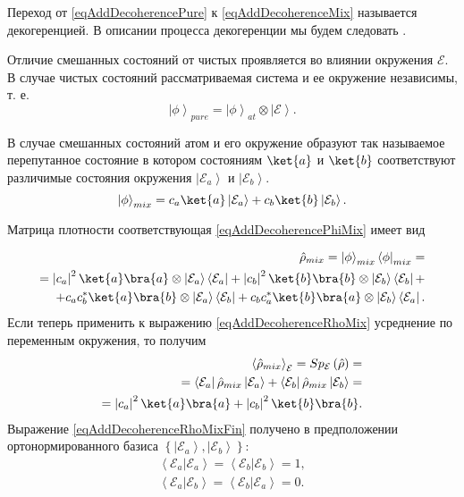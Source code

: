 Переход от \eqref{eqAddDecoherencePure} к \eqref{eqAddDecoherenceMix}
называется декогеренцией.
В описании процесса декогеренции мы будем следовать
 \cite{bMensky2001}. 

Отличие смешанных состояний от чистых проявляется во влиянии окружения
$\mathcal{E}$. В случае чистых состояний рассматриваемая система и ее
окружение независимы, т. е.
\begin{equation}
\left|\phi\right>_{pure} = \left|\phi\right>_{at} \otimes
\left|\mathcal{E}\right>.
\label{eqAddDecoherencePhiPure}
\end{equation}

В случае смешанных состояний атом и его окружение образуют так
называемое перепутанное состояние в котором состояниям
$\ket{a}$ и $\ket{b}$ соответствуют различимые 
состояния окружения $\left|\mathcal{E}_a\right>$ и
$\left|\mathcal{E}_b\right>$.
\begin{equation}
\left|\phi\right>_{mix} = c_a\ket{a} \left|\mathcal{E}_a\right>
+ c_b\ket{b} \left|\mathcal{E}_b\right>.
\label{eqAddDecoherencePhiMix}
\end{equation}

Матрица плотности 
соответствующая \eqref{eqAddDecoherencePhiMix} имеет вид

\begin{eqnarray}
\hat{\rho}_{mix} = \left|\phi\right>_{mix}\left<\phi\right|_{mix} = 
\nonumber \\
= 
\left|c_a\right|^2 \ket{a}\bra{a} \otimes
\left|\mathcal{E}_a\right>\left<\mathcal{E}_a\right| + 
\left|c_b\right|^2 \ket{b}\bra{b} \otimes
\left|\mathcal{E}_b\right>\left<\mathcal{E}_b\right| +
\nonumber \\
+
c_a c_b^{\ast}\ket{a}\bra{b} \otimes
\left|\mathcal{E}_a\right>\left<\mathcal{E}_b\right| +
c_b c_a^{\ast}\ket{b}\bra{a} \otimes
\left|\mathcal{E}_b\right>\left<\mathcal{E}_a\right|.
\label{eqAddDecoherenceRhoMix}
\end{eqnarray}
Если теперь применить к выражению \eqref{eqAddDecoherenceRhoMix}
усреднение по переменным окружения, то получим
\begin{eqnarray}
\left<\hat{\rho}_{mix}\right>_{\mathcal{E}} = 
Sp_{\mathcal{E}}\left(\hat{\rho}\right) = 
\nonumber \\
=
\left<\mathcal{E}_a\right|\hat{\rho}_{mix}\left|\mathcal{E}_a\right> +
\left<\mathcal{E}_b\right|\hat{\rho}_{mix}\left|\mathcal{E}_b\right>
= 
\nonumber \\
= \left|c_a\right|^2 \ket{a}\bra{a} + 
\left|c_b\right|^2 \ket{b}\bra{b}.
\label{eqAddDecoherenceRhoMixFin}
\end{eqnarray}
Выражение  \eqref{eqAddDecoherenceRhoMixFin} получено в предположении
ортонормированного базиса $\left\{\left|\mathcal{E}_a\right>,
\left|\mathcal{E}_b\right>\right\}$: 
\begin{eqnarray}
\left<\mathcal{E}_a\right.\left|\mathcal{E}_a\right> = 
\left<\mathcal{E}_b\right.\left|\mathcal{E}_b\right> = 1,
\nonumber \\
\left<\mathcal{E}_a\right.\left|\mathcal{E}_b\right> = 
\left<\mathcal{E}_b\right.\left|\mathcal{E}_a\right> = 0.
\label{eqAddDecoherenceMixECond}
\end{eqnarray}

